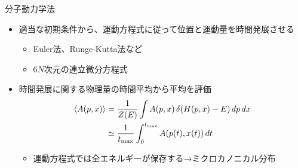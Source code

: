 \documentclass[dvipdfmx]{beamer}
\begin{document}

\begin{frame}[t,fragile]{分子動力学法}
  \begin{itemize}
    \setlength{\itemsep}{1em}
  \item 適当な初期条件から、運動方程式に従って位置と運動量を時間発展させる
    \begin{itemize}
    \item Euler法、Runge-Kutta法など
    \item $6N$次元の連立微分方程式
    \end{itemize}
  \item 時間発展に関する物理量の時間平均から平均を評価
    \begin{align*}
      \langle A(p,x) \rangle &= \frac{1}{Z(E)} \int A(p,x) \, \delta(H(p,x)-E) \, dp \, dx \\
      &\simeq \frac{1}{t_{\rm max}} \int_0^{t_{\rm max}} A(p(t),x(t)) \, dt
    \end{align*}
    \begin{itemize}
    \item 運動方程式では全エネルギーが保存する→ミクロカノニカル分布
    \end{itemize}
  \end{itemize}
\end{frame}
\end{document}
